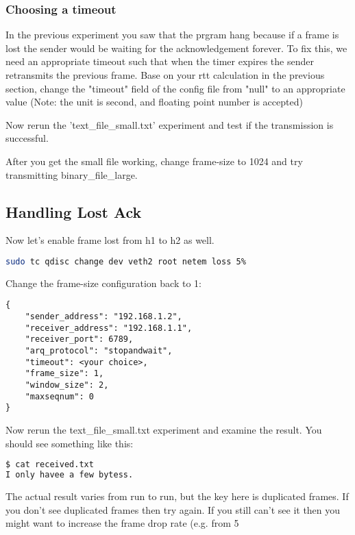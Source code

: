 \documentclass[11pt]{article}
\begin{document}
\subsubsection {Choosing a timeout}
In the previous experiment you saw that the prgram hang because if a frame is lost the sender would be waiting for the acknowledgement forever. To fix this, we need an appropriate timeout such that when the timer expires the sender retransmits the previous frame. Base on your rtt calculation in the previous section, change the "timeout" field of the config file from "null" to an appropriate value (Note: the unit is second, and floating point number is accepted)


\noindent Now rerun the 'text\_file\_small.txt' experiment and test if the transmission is successful.

\noindent After you get the small file working, change frame-size to 1024 and try transmitting binary\_file\_large.


\subsection {Handling Lost Ack}
Now let's enable frame lost from h1 to h2 as well.
\begin{lstlisting}[language=bash]
sudo tc qdisc change dev veth2 root netem loss 5%
\end{lstlisting}

Change the frame-size configuration back to 1:
\begin{lstlisting}[caption={Configuration For Large File}]
{
    "sender_address": "192.168.1.2",
    "receiver_address": "192.168.1.1",
    "receiver_port": 6789,
    "arq_protocol": "stopandwait",
    "timeout": <your choice>,
    "frame_size": 1,
    "window_size": 2,
    "maxseqnum": 0
}
\end{lstlisting}
Now rerun the text\_file\_small.txt experiment and examine the result. You should see something like this:

\begin{lstlisting}[language=bash]
$ cat received.txt 
I only havee a few bytess.
\end{lstlisting}
The actual result varies from run to run, but the key here is duplicated frames. If you don't see duplicated frames then try again. If you still can't see it then you might want to increase the frame drop rate (e.g. from 5%
\end{document}
